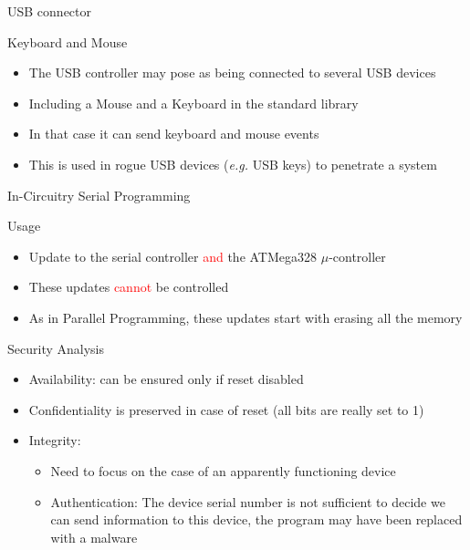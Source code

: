 \begin{reveals}
\begin{frame}[c]{USB connector}
  \vfill

  \begin{block}{Keyboard and Mouse}
    \begin{itemize}
    \item The USB controller may pose as being connected to several
      USB devices
    \item Including a Mouse and a Keyboard in the standard library
    \item In that case it can send keyboard and mouse events
    \item This is used in rogue USB devices (\textit{e.g.} USB keys)
      to penetrate a system
    \end{itemize}
  \end{block}

\end{frame}

\begin{frame}{In-Circuitry Serial Programming}
  
  \begin{block}{Usage}
    \begin{itemize}
    \item Update to the serial controller \textcolor{red}{and} the
      ATMega328 \(\mu\)-controller
    \item These updates \textcolor{red}{cannot} be controlled
    \item As in Parallel Programming, these updates start with erasing
      all the memory
    \end{itemize}
  \end{block}

  \vfill

  \begin{block}{Security Analysis}
    \begin{itemize}
    \item Availability: can be ensured only if reset disabled
    \item Confidentiality is preserved in case of reset (all bits are
      really set to 1)
    \item Integrity:
      \begin{itemize}
      \item Need to focus on the case of an apparently functioning
        device
      \item Authentication: The device serial number is not sufficient
        to decide we can send information to this device, the program
        may have been replaced with a malware
      \end{itemize}


\end{itemize}
\end{block}
\end{frame}
\end{reveals}
